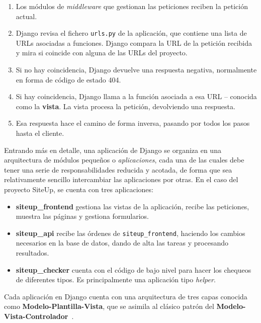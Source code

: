\begin{enumerate}
\item Los módulos de \textit{middleware} que gestionan las peticiones reciben la
  petición actual.
\item Django revisa el fichero \texttt{urls.py} de la aplicación, que contiene
  una lista de URLs asociadas a funciones. Django compara la URL de la petición
  recibida y mira si coincide con alguna de las URLs del proyecto.
\item Si no hay coincidencia, Django devuelve una respuesta negativa,
  normalmente en forma de código de estado 404.
\item Si hay coincidencia, Django llama a la función asociada a esa URL --
  conocida como la \textbf{vista}. La vista procesa la petición, devolviendo una
  respuesta.
\item Esa respuesta hace el camino de forma inversa, pasando por todos los pasos
  hasta el cliente.
\end{enumerate}

Entrando más en detalle, una aplicación de Django se organiza en una
arquitectura de módulos pequeños o \textit{aplicaciones}, cada una de las cuales
debe tener una serie de responsabilidades reducida y acotada, de forma que sea
relativamente sencillo intercambiar las aplicaciones por otras. En el caso del
proyecto SiteUp, se cuenta con tres aplicaciones:

\begin{itemize}
\item \textbf{siteup\_frontend} gestiona las vistas de la aplicación, recibe las
  peticiones, muestra las páginas y gestiona formularios.

\item \textbf{siteup\_api} recibe las órdenes de \texttt{siteup\_frontend},
  haciendo los cambios necesarios en la base de datos, dando de alta las tareas
  y procesando resultados.

\item \textbf{siteup\_checker} cuenta con el código de bajo nivel para hacer los
  chequeos de diferentes tipos. Es principalmente una aplicación tipo
  \textit{helper}.

\end{itemize}

Cada aplicación en Django cuenta con una arquitectura de tres capas conocida
como \textbf{Modelo-Plantilla-Vista}, que se asimila al clásico patrón del
\textbf{Modelo-Vista-Controlador}~\cite{django:mvc}.

